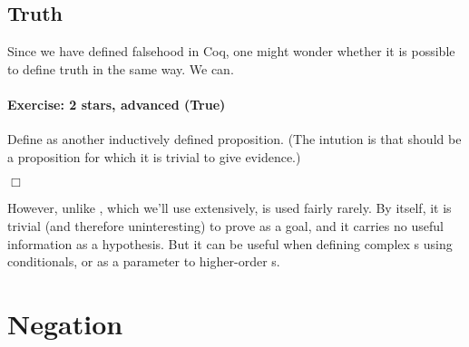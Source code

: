 \documentclass[12pt]{report}
\begin{document}
\subsection{Truth}



 Since we have defined falsehood in Coq, one might wonder whether
    it is possible to define truth in the same way.  We can. 

\paragraph{Exercise: 2 stars, advanced (True)}

 Define  as another inductively defined proposition.  (The
    intution is that  should be a proposition for which it is
    trivial to give evidence.) \begin{coqdoccode}
\coqdocemptyline
\end{coqdoccode}
\ensuremath{\Box} 

 However, unlike , which we'll use extensively,  is
    used fairly rarely. By itself, it is trivial (and therefore
    uninteresting) to prove as a goal, and it carries no useful
    information as a hypothesis. But it can be useful when defining
    complex s using conditionals, or as a parameter to 
    higher-order s. \begin{coqdoccode}
\coqdocemptyline
\end{coqdoccode}
\section{Negation}
\end{document}
